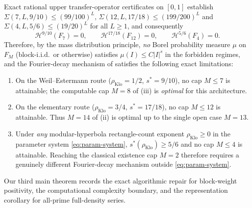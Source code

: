 \documentclass[11pt]{article}
\newcommand{\Hmeas}{\mathcal{H}}
\newcommand{\rhoK}{\rho_{\mathrm{Klo}}}
\begin{document}
\begin{maintheorem}\label{thm:B}
Exact rational upper transfer-operator certificates on $[0,1]$ establish $\Sigma(7,L,9/10)\le(99/100)^L$, $\Sigma(12,L,17/18)\le(199/200)^L$ and $\Sigma(4,L,5/6)\le(19/20)^L$ for all $L\ge1$, and consequently
\[
\Hmeas^{9/10}(F_7)=0,\qquad \Hmeas^{17/18}(F_{12})=0,\qquad \Hmeas^{5/6}(F_4)=0.
\]
Therefore, by the mass distribution principle, \emph{no} Borel probability measure $\mu$ on $F_M$ (block-i.i.d.\ or otherwise) satisfies $\mu(I)\le C|I|^s$ in the forbidden regimes, and the Fourier-decay mechanism of  satisfies the following exact limitations:
\begin{enumerate}[label=\textup{(\roman*)},nosep]
\item On the Weil--Estermann route ($\rhoK=1/2$, $s^*=9/10$), no cap $M\le7$ is attainable; the computable cap $M=8$ of \textup{(iii)} is \emph{optimal} for this architecture.
\item On the elementary route ($\rhoK=3/4$, $s^*=17/18$), no cap $M\le12$ is attainable. Thus $M=14$ of \textup{(ii)} is optimal up to the single open case $M=13$.
\item Under \emph{any} modular-hyperbola rectangle-count exponent $\rhoK\ge0$ in the parameter system \eqref{eq:param-system}, $s^*(\rhoK)\ge5/6$ and no cap $M\le4$ is attainable. Reaching the classical existence cap $M=2$ therefore requires a genuinely different Fourier-decay mechanism outside \eqref{eq:param-system}.
\end{enumerate}
\end{maintheorem}

Our third main theorem records the exact algorithmic repair for block-weight positivity, the computational complexity boundary, and the representation corollary for all-prime full-density series.
\end{document}
